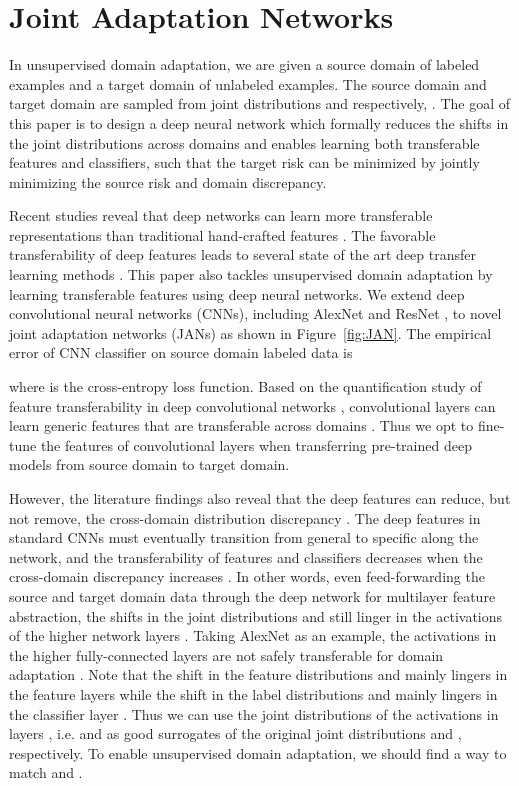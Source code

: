 \documentclass{article}
\begin{document}
\section{Joint Adaptation Networks}
In unsupervised domain adaptation, we are given a source domain  of  labeled examples and a target domain  of  unlabeled examples. The source domain and target domain are sampled from joint distributions  and  respectively, . The goal of this paper is to design a deep neural network  which formally reduces the shifts in the joint distributions across domains and enables learning both transferable features and classifiers, such that the target risk  can be minimized by jointly minimizing the source risk and domain discrepancy.

Recent studies reveal that deep networks \cite{cite:TPAMI13DLSurvey} can learn more transferable representations than traditional hand-crafted features \cite{cite:CVPR13MidLevel,cite:NIPS14CNN}. The favorable transferability of deep features leads to several state of the art deep transfer learning methods \cite{cite:ICML15RevGrad,cite:ICCV15SDT,cite:ICML15DAN,cite:NIPS16RTN}. This paper also tackles unsupervised domain adaptation by learning transferable features using deep neural networks. We extend deep convolutional neural networks (CNNs), including AlexNet \cite{cite:NIPS12CNN} and ResNet \cite{cite:CVPR16DRL}, to novel joint adaptation networks (JANs) as shown in Figure~\ref{fig:JAN}. The empirical error of CNN classifier  on source domain labeled data  is

where  is the cross-entropy loss function. Based on the quantification study of feature transferability in deep convolutional networks \cite{cite:NIPS14CNN}, convolutional layers can learn generic features that are transferable across domains \cite{cite:NIPS14CNN}. Thus we opt to fine-tune the features of convolutional layers when transferring pre-trained deep models from source domain to target domain.

However, the literature findings also reveal that the deep features can reduce, but not remove, the cross-domain distribution discrepancy \cite{cite:NIPS14CNN,cite:ICML15DAN,cite:NIPS16RTN}. The deep features in standard CNNs must eventually transition from general to specific along the network, and the transferability of features and classifiers decreases when the cross-domain discrepancy increases \cite{cite:NIPS14CNN}. In other words, even feed-forwarding the source and target domain data through the deep network for multilayer feature abstraction, the shifts in the joint distributions  and  still linger in the activations  of the higher network layers . Taking AlexNet \cite{cite:NIPS12CNN} as an example, the activations in the higher fully-connected layers  are not safely transferable for domain adaptation \cite{cite:NIPS14CNN}. Note that the shift in the feature distributions  and  mainly lingers in the feature layers  while the shift in the label distributions  and  mainly lingers in the classifier layer . Thus we can use the joint distributions of the activations in layers , i.e.  and  as good surrogates of the original joint distributions  and , respectively. To enable unsupervised domain adaptation, we should find a way to match  and .
\end{document}
